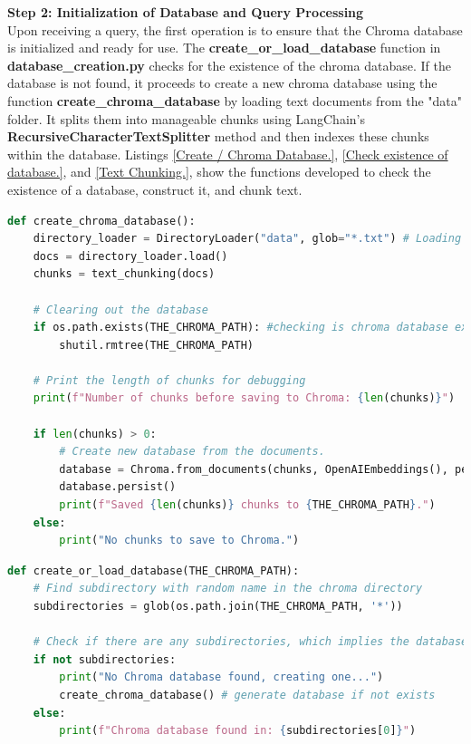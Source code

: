 \documentclass{l4proj}
\begin{document}
\textbf{Step 2: Initialization of Database and Query Processing}
\\
Upon receiving a query, the first operation is to ensure that the Chroma database is initialized and ready for use. The \textbf{create\_or\_load\_database} function in \textbf{database\_creation.py} checks for the existence of the chroma database. If the database is not found, it proceeds to create a new chroma database using the function \textbf{create\_chroma\_database} by loading text documents from the "data" folder. It splits them into manageable chunks using LangChain's \textbf{RecursiveCharacterTextSplitter} method and then indexes these chunks within the database. Listings  \ref{Create / Chroma Database.}, \ref{Check existence of database.}, and \ref{Text Chunking.}, show the functions developed to check the existence of a database, construct it, and chunk text.

\begin{lstlisting}[language=Python, caption={Create / Chroma Database.}, label={Create / Chroma Database.}]
def create_chroma_database():
    directory_loader = DirectoryLoader("data", glob="*.txt") # Loading documents sitting in the directory
    docs = directory_loader.load()
    chunks = text_chunking(docs)

    # Clearing out the database
    if os.path.exists(THE_CHROMA_PATH): #checking is chroma database exists
        shutil.rmtree(THE_CHROMA_PATH)

    # Print the length of chunks for debugging
    print(f"Number of chunks before saving to Chroma: {len(chunks)}")

    if len(chunks) > 0:
        # Create new database from the documents.
        database = Chroma.from_documents(chunks, OpenAIEmbeddings(), persist_directory=THE_CHROMA_PATH)
        database.persist()
        print(f"Saved {len(chunks)} chunks to {THE_CHROMA_PATH}.")
    else:
        print("No chunks to save to Chroma.")
\end{lstlisting}

\begin{lstlisting}[language=Python, caption={Checks existence of database.}, label={Check existence of database.}]
def create_or_load_database(THE_CHROMA_PATH):
    # Find subdirectory with random name in the chroma directory
    subdirectories = glob(os.path.join(THE_CHROMA_PATH, '*'))
    
    # Check if there are any subdirectories, which implies the database exists
    if not subdirectories:
        print("No Chroma database found, creating one...")
        create_chroma_database() # generate database if not exists
    else:
        print(f"Chroma database found in: {subdirectories[0]}")
\end{lstlisting}
\end{document}
